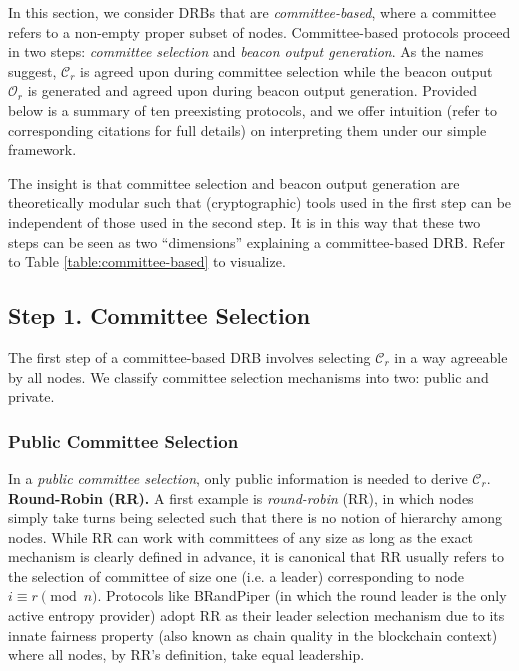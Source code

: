 \documentclass[conference]{IEEEtran}
\theoremstyle{definition}
\theoremstyle{remark}
\begin{document}
In this section, we consider DRBs that are \textit{committee-based}, where a committee refers to a non-empty proper subset of nodes. Committee-based protocols proceed in two steps: \textit{committee selection} and \textit{beacon output generation}. As the names suggest, $\mathcal{C}_r$ is agreed upon during committee selection while the beacon output $\mathcal{O}_r$ is generated and agreed upon during beacon output generation. Provided below is a summary of ten preexisting protocols, and we offer intuition (refer to corresponding citations for full details) on interpreting them under our simple framework.

The insight is that committee selection and beacon output generation are theoretically modular such that (cryptographic) tools used in the first step can be independent of those used in the second step. It is in this way that these two steps can be seen as two ``dimensions'' explaining a committee-based DRB. Refer to Table \ref{table:committee-based} to visualize.

\subsection{Step 1. Committee Selection}
The first step of a committee-based DRB involves selecting $\mathcal{C}_r$ in a way agreeable by all nodes. We classify committee selection mechanisms into two: public and private.

\subsubsection{Public Committee Selection}
\label{subsubsection:public-committee-selection}
In a \textit{public committee selection}, only public information is needed to derive $\mathcal{C}_r$.\\

\noindent\textbf{Round-Robin (RR).} A first example is \textit{round-robin} (RR), in which nodes simply take turns being selected such that there is no notion of hierarchy among nodes. While RR can work with committees of any size as long as the exact mechanism is clearly defined in advance, it is canonical that RR usually refers to the selection of committee of size one (i.e. a leader) corresponding to node $i \equiv r \pmod n$. Protocols like BRandPiper \cite{bhat2020randpiper} (in which the round leader is the only active entropy provider) adopt RR as their leader selection mechanism due to its innate fairness property \cite{azouvi2018winning} (also known as chain quality \cite{garay2015bitcoin} in the blockchain context) where all nodes, by RR's definition, take equal leadership.\\
\end{document}
